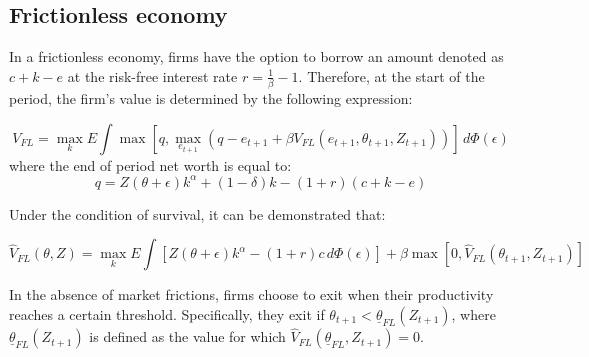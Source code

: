 \documentclass{article}
\begin{document}
\subsection{Frictionless economy}
In a frictionless economy, firms have the option to borrow an amount denoted as \(c+k-e\) at the risk-free interest rate
\(r=\frac{1}{\beta}-1\). Therefore, at the start of the period, the firm's value is determined by the following
expression:

\[V_{FL} = \max_{k} E \int \max[q,\max_{e_{t+1}}(q - e_{t+1} + \beta V_{FL}(e_{t+1},\theta_{t+1}, Z_{t+1}))]  \,d\Phi
(\epsilon) \]
where the end of period net worth is equal to:
\[q=Z(\theta+\epsilon)k^\alpha + (1-\delta )k-(1+r)(c+k-e)\]

Under the condition of survival, it can be demonstrated that:

\[\widehat{V}_{FL}(\theta,Z) = \max_{k}E\int[Z(\theta+\epsilon)k^\alpha - (1+r)c\,d\Phi (\epsilon)] +
\beta\max[0,\widehat{V}_{FL}(\theta_{t+1},Z_{t+1})]\]

In the absence of market frictions, firms choose to exit when their productivity reaches a certain threshold.
Specifically, they exit if \(\theta_{t+1}<\underline{\theta} _{FL}(Z_{t+1})\), where \(\underline{\theta}
_{FL}(Z_{t+1})\) is defined as the value
for which \(\widehat{V}_{FL}(\underline{\theta}_{FL},Z_{t+1})=0\).
\end{document}

